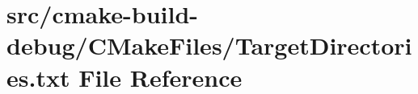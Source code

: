 \hypertarget{cmake-build-debug_2CMakeFiles_2TargetDirectories_8txt}{}\section{src/cmake-\/build-\/debug/\+C\+Make\+Files/\+Target\+Directories.txt File Reference}
\label{cmake-build-debug_2CMakeFiles_2TargetDirectories_8txt}
